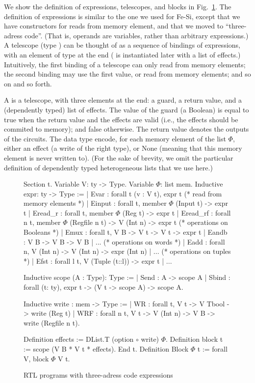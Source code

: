 \documentclass{llncs}
\begin{document}
We show the definition of expressions, telescopes, and blocks in
Fig.~\ref{fig:rtl}. 
%
The definition of expressions is similar to the one we used for Fe-Si,
except that we have constructors for reads from memory element, and
that we moved to ``three-adress code''.
%
(That is, operands are variables, rather than arbitrary expressions.)
%
A telescope (type ) can be thought of as a sequence of
bindings of expressions, with an element of type  at the
end ( is instantiated later with a list of effects.)
%
Intuitively, the first binding of a telescope can only read from
memory elements; the second binding may use the first value, or read
from memory elements; and so on and so forth.

A  is a telescope, with three elements at the end: a
guard, a return value, and a (dependently typed) list of effects. 
%
The value of the guard (a Boolean) is equal to true when the
return value and the effects are valid (i.e., the effects should be
commited to memory); and false otherwise.
%
The return value denotes the outputs of the circuits. 
%
The data type  encode, for each memory element of the
list $\Phi$, either an effect (a write of the right type), or None
(meaning that this memory element is never written to). (For the sake
of brevity, we omit the particular definition of dependently typed
heterogeneous lists  that we use here.)


\begin{figure}
  \centering
\begin{coq}
Section t. 
Variable V: ty -> Type. Variable $\Phi$: list mem. 
Inductive expr: ty -> Type :=
| Evar : forall t (v : V t), expr t
(* read from memory elements *)
| Einput : forall t, member $\Phi$ (Input t) -> expr t
| Eread_r : forall t, member $\Phi$ (Reg t) -> expr t
| Eread_rf : forall n t, member $\Phi$ (Regfile n t) -> V (Int n) -> expr t
(* operations on Booleans *)
| Emux : forall t, V B -> V t -> V t -> expr t
| Eandb : V B -> V B -> V B | ... 
(* operations on words *)
| Eadd : forall n, V (Int n) -> V (Int n) -> expr (Int n) | ... 
(* operations on tuples *)
| Efst : forall l t, V (Tuple (t::l)) -> expr t | ...

Inductive scope (A : Type): Type :=
| Send : A -> scope A
| Sbind : forall (t: ty), expr t -> (V t -> scope A) -> scope A. 

Inductive write : mem -> Type :=
| WR : forall t, V t -> V Tbool -> write (Reg t)
| WRF : forall n t, V t -> V (Int n) -> V B ->  write (Regfile n t). 
     
Definition effects := DList.T (option $\circ$ write) $\Phi$. 
Definition block t := scope (V B * V t *  effects).         
End t.
Definition Block $\Phi$ t := forall V, block $\Phi$ V t.
\end{coq}
  \caption{RTL programs with three-adress code expressions}
  \label{fig:rtl}
\end{figure}
\end{document}
